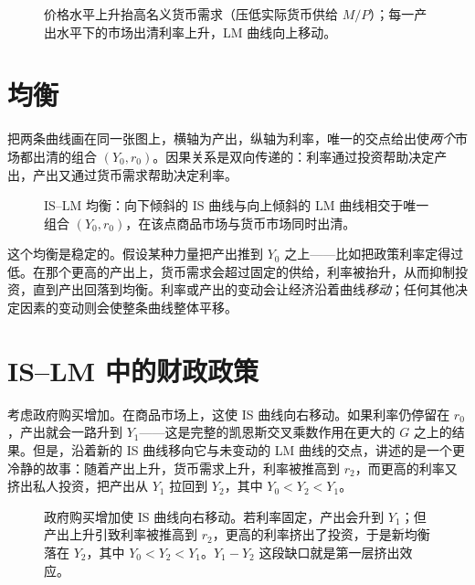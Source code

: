 \begin{figure}[h]
\centering

\caption{价格水平上升抬高名义货币需求（压低实际货币供给 $M/P$）；每一产出水平下的市场出清利率上升，LM 曲线向上移动。}
\label{fig:macro-20}
\end{figure}


\section{均衡}

把两条曲线画在同一张图上，横轴为产出，纵轴为利率，唯一的交点给出使\emph{两个}市场都出清的组合 $(Y_0,r_0)$。因果关系是双向传递的：利率通过投资帮助决定产出，产出又通过货币需求帮助决定利率。

\begin{figure}[h]
\centering

\caption{IS--LM 均衡：向下倾斜的 IS 曲线与向上倾斜的 LM 曲线相交于唯一组合 $(Y_0,r_0)$，在该点商品市场与货币市场同时出清。}
\label{fig:macro-21}
\end{figure}

这个均衡是稳定的。假设某种力量把产出推到 $Y_0$ 之上——比如把政策利率定得过低。在那个更高的产出上，货币需求会超过固定的供给，利率被抬升，从而抑制投资，直到产出回落到均衡。利率或产出的变动会让经济沿着曲线\emph{移动}；任何其他决定因素的变动则会使整条曲线整体平移。

\section{IS--LM 中的财政政策}

考虑政府购买增加。在商品市场上，这使 IS 曲线向右移动。如果利率仍停留在 $r_0$，产出就会一路升到 $Y_1$——这是完整的凯恩斯交叉乘数作用在更大的 $G$ 之上的结果。但是，沿着新的 IS 曲线移向它与未变动的 LM 曲线的交点，讲述的是一个更冷静的故事：随着产出上升，货币需求上升，利率被推高到 $r_2$，而更高的利率又挤出私人投资，把产出从 $Y_1$ 拉回到 $Y_2$，其中 $Y_0<Y_2<Y_1$。

\begin{figure}[h]
\centering

\caption{政府购买增加使 IS 曲线向右移动。若利率固定，产出会升到 $Y_1$；但产出上升引致利率被推高到 $r_2$，更高的利率挤出了投资，于是新均衡落在 $Y_2$，其中 $Y_0<Y_2<Y_1$。$Y_1-Y_2$ 这段缺口就是第一层挤出效应。}
\label{fig:macro-22}
\end{figure}

